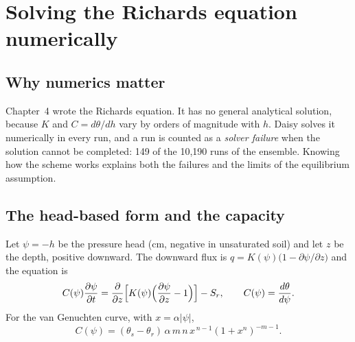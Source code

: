 \chapter{Solving the Richards equation numerically}\label{ch:rich}

\section{Why numerics matter}
Chapter~4 wrote the Richards equation. It has no general analytical solution, because $K$ and $C=d\theta/dh$ vary by orders of magnitude with $h$. Daisy solves it numerically in every run, and a run is counted as a \emph{solver failure} when the solution cannot be completed: 149 of the 10,190 runs of the ensemble. Knowing how the scheme works explains both the failures and the limits of the equilibrium assumption.

\section{The head-based form and the capacity}
Let $\psi=-h$ be the pressure head (cm, negative in unsaturated soil) and let $z$ be the depth, positive downward. The downward flux is $q=K(\psi)\bigl(1-\partial\psi/\partial z\bigr)$ and the equation is
\begin{equation}\label{eq:rich-psi}
C(\psi)\frac{\partial\psi}{\partial t}=\frac{\partial}{\partial z}\Bigl[K(\psi)\Bigl(\frac{\partial\psi}{\partial z}-1\Bigr)\Bigr]-S_r,\qquad C(\psi)=\frac{d\theta}{d\psi}.
\end{equation}
For the van Genuchten curve, with $x=\alpha|\psi|$,
\begin{equation}\label{eq:cap}\boxed{C(\psi)=(\theta_s-\theta_r)\,\alpha\,m\,n\,x^{\,n-1}(1+x^n)^{-m-1}.}\end{equation}



